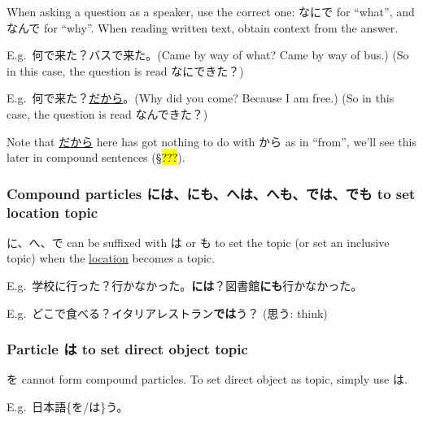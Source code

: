 \documentclass[../nihongo-gakushuu-kyouzai.tex]{subfiles}
\begin{document}
When asking a question as a speaker, use the correct one: なにで for ``what'', and なんで for ``why''. When reading written text, obtain context from the answer. 

E.g.\ 何で来た？バスで来た。(Came by way of what? Came by  way of bus.) (So in this case, the question is read なにできた？)

E.g.\ 何で来た？\underline{だから}。(Why did you come? Because I am free.) (So in this case, the question is read なんできた？)

Note that \underline{だから} here has got nothing to do with から as in ``from'', we'll see this later in compound sentences (\S\hl{???}).

\subsubsection{Compound particles には、にも、へは、へも、では、でも to set location topic}
に、へ、で can be suffixed with は or も to set the topic (or set an inclusive topic) when the \ul{location} becomes a topic.

E.g.\ 学校に行った？行かなかった。\textbf{には}？図書館\textbf{にも}行かなかった。

E.g.\ どこで食べる？イタリアレストラン\textbf{では}う？ (思う: think)

\subsubsection{Particle は to set direct object topic}
を cannot form compound particles. To set direct object as topic, simply use は.

E.g.\ 日本語\{を/は\}う。
\end{document}

